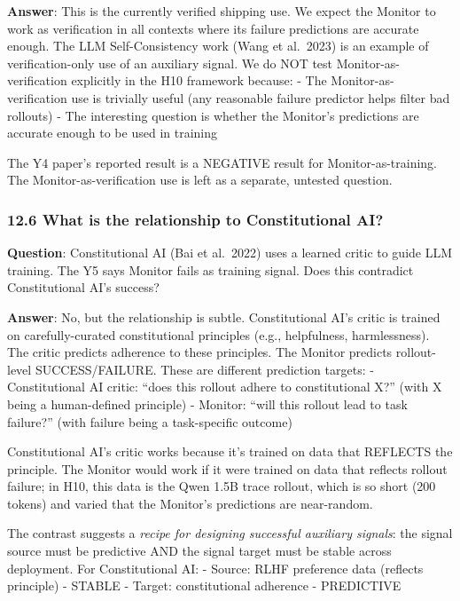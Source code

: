 \documentclass[
]{article}
\begin{document}
\textbf{Answer}: This is the currently verified shipping use. We expect
the Monitor to work as verification in all contexts where its failure
predictions are accurate enough. The LLM Self-Consistency work (Wang et
al.~2023) is an example of verification-only use of an auxiliary signal.
We do NOT test Monitor-as-verification explicitly in the H10 framework
because: - The Monitor-as-verification use is trivially useful (any
reasonable failure predictor helps filter bad rollouts) - The
interesting question is whether the Monitor's predictions are accurate
enough to be used in training

The Y4 paper's reported result is a NEGATIVE result for
Monitor-as-training. The Monitor-as-verification use is left as a
separate, untested question.

\subsubsection{12.6 What is the relationship to Constitutional
AI?}\label{what-is-the-relationship-to-constitutional-ai}

\textbf{Question}: Constitutional AI (Bai et al.~2022) uses a learned
critic to guide LLM training. The Y5 says Monitor fails as training
signal. Does this contradict Constitutional AI's success?

\textbf{Answer}: No, but the relationship is subtle. Constitutional AI's
critic is trained on carefully-curated constitutional principles (e.g.,
helpfulness, harmlessness). The critic predicts adherence to these
principles. The Monitor predicts rollout-level SUCCESS/FAILURE. These
are different prediction targets: - Constitutional AI critic: ``does
this rollout adhere to constitutional X?'' (with X being a human-defined
principle) - Monitor: ``will this rollout lead to task failure?'' (with
failure being a task-specific outcome)

Constitutional AI's critic works because it's trained on data that
REFLECTS the principle. The Monitor would work if it were trained on
data that reflects rollout failure; in H10, this data is the Qwen 1.5B
trace rollout, which is so short (200 tokens) and varied that the
Monitor's predictions are near-random.

The contrast suggests a \emph{recipe for designing successful auxiliary
signals}: the signal source must be predictive AND the signal target
must be stable across deployment. For Constitutional AI: - Source: RLHF
preference data (reflects principle) - STABLE - Target: constitutional
adherence - PREDICTIVE
\end{document}
